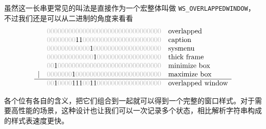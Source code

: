 \begin{itemize}
          虽然这一长串更常见的叫法是直接作为一个宏整体叫做 \texttt{WS\_OVERLAPPEDWINDOW}，不过我们还是可以从二进制的角度来看看
          \[
              \begin{array}{ccl}
                                                & \color{lightgray} 00000000000000000000000000000000                                              & \text{overlapped}        \\
                                                & \color{lightgray} 00000000{\color{black}11}0000000000000000000000                               & \text{caption}           \\
                                                & \color{lightgray} 000000000000{\color{black}1}0000000000000000000                               & \text{sysmenu}           \\
                                                & \color{lightgray} 0000000000000{\color{black}1}000000000000000000                               & \text{thick frame}       \\
                                                & \color{lightgray} 00{\color{black}1}
                  00000000000000000000000000000 & \text{minimize box}                                                                                                        \\
                  |                             & \color{lightgray} 0000000{\color{black}1}000000000000000000000000                               & \text{maximize box}      \\
                  \hline
                                                & \color{lightgray} 00{\color{black}1}0000{\color{black}111}00{\color{black}11}000000000000000000 & \text{overlapped window}
              \end{array}
          \]

          各个位有各自的含义，把它们组合到一起就可以得到一个完整的窗口样式。对于需要高性能的场景，这种设计也让我们可以一次记录多个状态，相比解析字符串构成的样式表速度更快。


\end{itemize}
